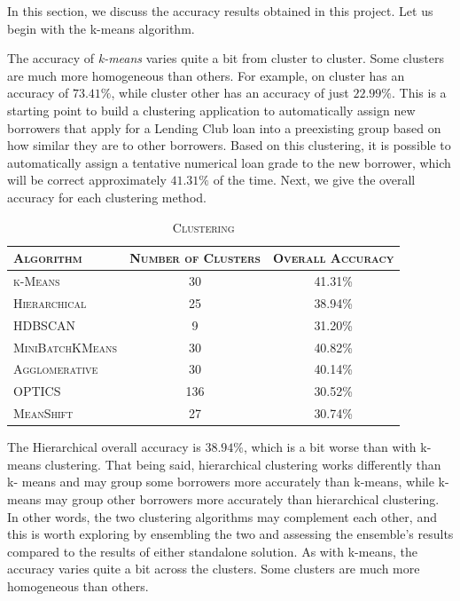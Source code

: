 \documentclass[a4paper,11pt]{amsart}
\begin{document}
In this section, we discuss the accuracy results obtained in this project. Let us begin with the k-means algorithm. 

\medbreak

The accuracy of \emph{k-means} varies quite a bit from cluster to cluster. Some clusters are much more homogeneous than others. For example, on cluster has an accuracy of $73.41\%$, while cluster other has an accuracy of just $22.99\%$. This is a starting point to build a clustering application to automatically assign new borrowers that apply for a Lending Club loan into a preexisting group based on how similar they are to other borrowers. Based on this clustering, it is possible to automatically assign a tentative numerical loan grade to the new borrower, which will be correct approximately $41.31\%$ of the time. Next, we give the overall accuracy for each clustering method.
\begin{table}[h!]
  \begin{center}
    \caption{\textsc{Clustering}}
    \label{tab:table1}
    \begin{tabular}{l|c|c|} 
      \textsc{Algorithm}& \textsc{Number of Clusters} &\textsc{Overall Accuracy}\\
      \hline
       \textsc{k-Means}& 30  &41.31\%\\
       \hline
        \textsc{Hierarchical}& 25  &38.94\%\\
       \hline
        \textsc{HDBSCAN}& 9 &31.20\%\\
       \hline
        \textsc{MiniBatchKMeans}& 30  &40.82\%\\
       \hline
        \textsc{Agglomerative}& 30  &40.14\%\\
       \hline
        \textsc{OPTICS}& 136  &30.52\%\\
        \hline
         \textsc{MeanShift}& 27  &30.74\%\\
       \hline
    \end{tabular}
  \end{center}
\end{table}

\medbreak

The Hierarchical overall accuracy is  $38.94\%$, which is a bit worse than with k-means clustering. That being said, hierarchical clustering works differently than k- means and may group some borrowers more accurately than k-means, while k- means may group other borrowers more accurately than hierarchical clustering. In other words, the two clustering algorithms may complement each other, and this is worth exploring by ensembling the two and assessing the ensemble’s results compared to the results of either standalone solution. As with k-means, the accuracy varies quite a bit across the clusters. Some clusters are much more homogeneous than others.
\end{document}
